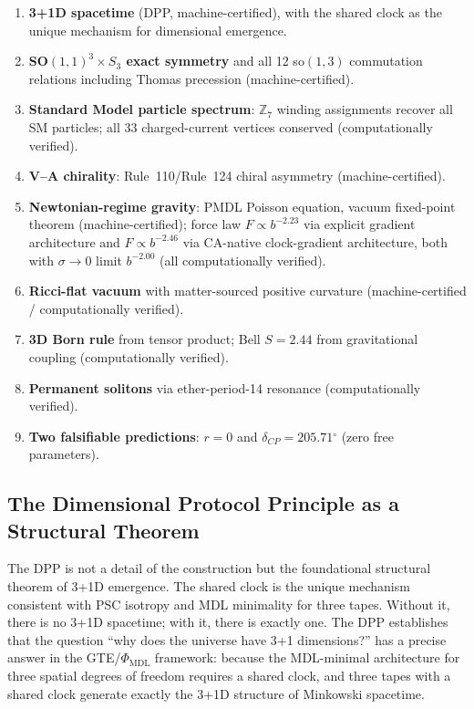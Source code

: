 \documentclass[11pt]{article}
\theoremstyle{remark}
\newcommand{\PHIMDL}{\Phi_{\mathrm{MDL}}}
\newcommand{\ZS}{\mathbb{Z}_7}
\begin{document}
\begin{enumerate}[label=(\arabic*)]
  \item \textbf{3+1D spacetime} (DPP, machine-certified), with the shared
        clock as the unique mechanism for dimensional emergence.
  \item \textbf{SO$(1,1)^3 \times S_3$ exact symmetry} and all 12 so$(1,3)$
        commutation relations including Thomas precession (machine-certified).
  \item \textbf{Standard Model particle spectrum}: $\ZS$ winding assignments
        recover all SM particles; all 33 charged-current vertices conserved
        (computationally verified).
  \item \textbf{V--A chirality}: Rule~110/Rule~124 chiral asymmetry
        (machine-certified).
  \item \textbf{Newtonian-regime gravity}: PMDL Poisson equation, vacuum
        fixed-point theorem (machine-certified); force law $F \propto
        b^{-2.23}$ via explicit gradient architecture and $F \propto
        b^{-2.46}$ via CA-native clock-gradient architecture, both with
        $\sigma\to 0$ limit $b^{-2.00}$ (all computationally verified).
  \item \textbf{Ricci-flat vacuum} with matter-sourced positive curvature
        (machine-certified / computationally verified).
  \item \textbf{3D Born rule} from tensor product; Bell $S = 2.44$ from
        gravitational coupling (computationally verified).
  \item \textbf{Permanent solitons} via ether-period-14 resonance
        (computationally verified).
  \item \textbf{Two falsifiable predictions}: $r = 0$ and $\delta_{CP} =
        205.71{\ensuremath{{}^\circ}}$ (zero free parameters).
\end{enumerate}

\subsection{The Dimensional Protocol Principle as a Structural Theorem}

The DPP is not a detail of the construction but the foundational structural
theorem of 3+1D emergence. The shared clock is the unique mechanism consistent
with PSC isotropy and MDL minimality for three tapes. Without it, there is no
3+1D spacetime; with it, there is exactly one. The DPP establishes that the
question ``why does the universe have 3+1 dimensions?'' has a precise answer
in the GTE/$\PHIMDL$ framework: because the MDL-minimal architecture for
three spatial degrees of freedom requires a shared clock, and three tapes
with a shared clock generate exactly the 3+1D structure of Minkowski
spacetime.
\end{document}
